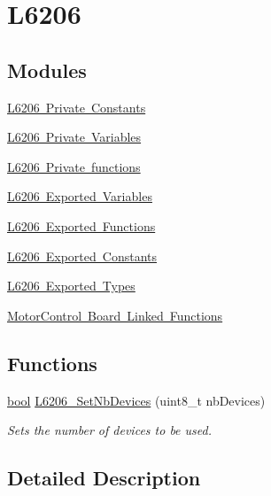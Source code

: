 \hypertarget{group___l6206}{}\section{L6206}
\label{group___l6206}
\subsection*{Modules}
\begin{DoxyCompactItemize}
\item 
\mbox{\hyperlink{group___l6206___private___constants}{L6206 Private Constants}}
\item 
\mbox{\hyperlink{group___l6206___private___variables}{L6206 Private Variables}}
\item 
\mbox{\hyperlink{group___l6206___private__functions}{L6206 Private functions}}
\item 
\mbox{\hyperlink{group___l6206___exported___variables}{L6206 Exported Variables}}
\item 
\mbox{\hyperlink{group___l6206___exported___functions}{L6206 Exported Functions}}
\item 
\mbox{\hyperlink{group___l6206___exported___constants}{L6206 Exported Constants}}
\item 
\mbox{\hyperlink{group___l6206___exported___types}{L6206 Exported Types}}
\item 
\mbox{\hyperlink{group___motor_control___board___linked___functions}{Motor\+Control Board Linked Functions}}
\end{DoxyCompactItemize}
\subsection*{Functions}
\begin{DoxyCompactItemize}
\item 
\mbox{\hyperlink{group___motor___boolean___type_ga0ecf26b576b9a54eca656b9be7ba6a06}{bool}} \mbox{\hyperlink{group___l6206_gaa25442be9b6a3d12b3c3b28568350528}{L6206\+\_\+\+Set\+Nb\+Devices}} (uint8\+\_\+t nb\+Devices)
\begin{DoxyCompactList}\small\item\em Sets the number of devices to be used. \end{DoxyCompactList}\end{DoxyCompactItemize}


\subsection{Detailed Description}


